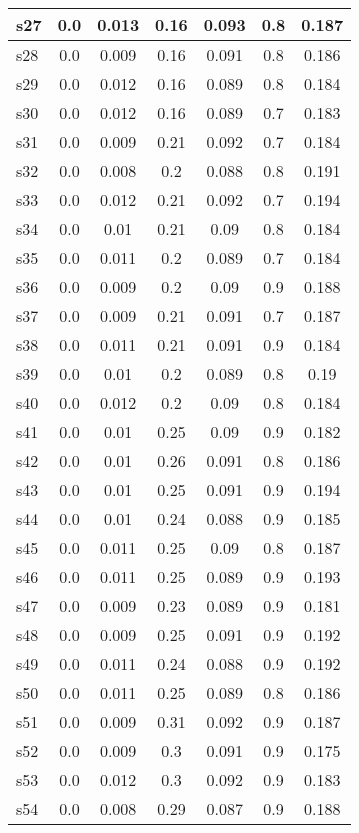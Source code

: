 \documentclass{article}
\begin{document}
\begin{tabular}{|l|c|c|c|c|c|c|}
\hline
s27 &0.0 & 0.013 & 0.16 & 0.093 & 0.8 & 0.187\\
\hline
s28 &0.0 & 0.009 & 0.16 & 0.091 & 0.8 & 0.186\\
\hline
s29 &0.0 & 0.012 & 0.16 & 0.089 & 0.8 & 0.184\\
\hline
s30 &0.0 & 0.012 & 0.16 & 0.089 & 0.7 & 0.183\\
\hline
s31 &0.0 & 0.009 & 0.21 & 0.092 & 0.7 & 0.184\\
\hline
s32 &0.0 & 0.008 & 0.2 & 0.088 & 0.8 & 0.191\\
\hline
s33 &0.0 & 0.012 & 0.21 & 0.092 & 0.7 & 0.194\\
\hline
s34 &0.0 & 0.01 & 0.21 & 0.09 & 0.8 & 0.184\\
\hline
s35 &0.0 & 0.011 & 0.2 & 0.089 & 0.7 & 0.184\\
\hline
s36 &0.0 & 0.009 & 0.2 & 0.09 & 0.9 & 0.188\\
\hline
s37 &0.0 & 0.009 & 0.21 & 0.091 & 0.7 & 0.187\\
\hline
s38 &0.0 & 0.011 & 0.21 & 0.091 & 0.9 & 0.184\\
\hline
s39 &0.0 & 0.01 & 0.2 & 0.089 & 0.8 & 0.19\\
\hline
s40 &0.0 & 0.012 & 0.2 & 0.09 & 0.8 & 0.184\\
\hline
s41 &0.0 & 0.01 & 0.25 & 0.09 & 0.9 & 0.182\\
\hline
s42 &0.0 & 0.01 & 0.26 & 0.091 & 0.8 & 0.186\\
\hline
s43 &0.0 & 0.01 & 0.25 & 0.091 & 0.9 & 0.194\\
\hline
s44 &0.0 & 0.01 & 0.24 & 0.088 & 0.9 & 0.185\\
\hline
s45 &0.0 & 0.011 & 0.25 & 0.09 & 0.8 & 0.187\\
\hline
s46 &0.0 & 0.011 & 0.25 & 0.089 & 0.9 & 0.193\\
\hline
s47 &0.0 & 0.009 & 0.23 & 0.089 & 0.9 & 0.181\\
\hline
s48 &0.0 & 0.009 & 0.25 & 0.091 & 0.9 & 0.192\\
\hline
s49 &0.0 & 0.011 & 0.24 & 0.088 & 0.9 & 0.192\\
\hline
s50 &0.0 & 0.011 & 0.25 & 0.089 & 0.8 & 0.186\\
\hline
s51 &0.0 & 0.009 & 0.31 & 0.092 & 0.9 & 0.187\\
\hline
s52 &0.0 & 0.009 & 0.3 & 0.091 & 0.9 & 0.175\\
\hline
s53 &0.0 & 0.012 & 0.3 & 0.092 & 0.9 & 0.183\\
\hline
s54 &0.0 & 0.008 & 0.29 & 0.087 & 0.9 & 0.188\\

\end{tabular}
\end{document}
